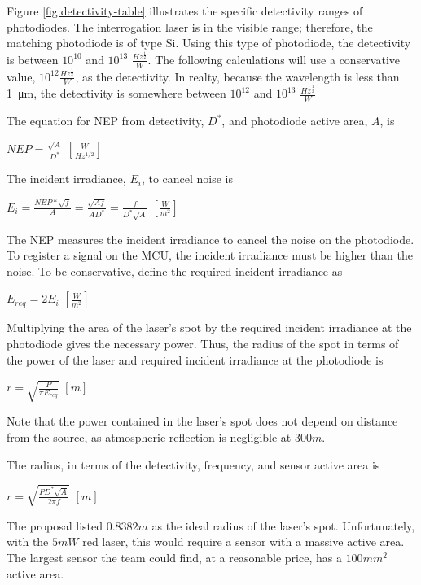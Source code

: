 \documentclass[letterpaper,10pt]{article}
\begin{document}
\begin{spacing}{1.15}
Figure \ref{fig:detectivity-table} illustrates the specific detectivity ranges of photodiodes. The interrogation laser is in the visible range; therefore, the matching photodiode is of type Si. Using this type of photodiode, the detectivity is between $10^{10}$ and $10^{13}$ $\frac{Hz^{\frac{1}{2}}}{W}$. The following calculations will use a conservative value, $10^{12} \frac{Hz^{\frac{1}{2}}}{W}$, as the detectivity. In realty, because the wavelength is less than \SI{1}{\micro\meter}, the detectivity is somewhere between $10^{12}$ and $10^{13}$ $\frac{Hz^{\frac{1}{2}}}{W}$

The equation for NEP from detectivity, $D^*$, and photodiode active area, $A$,  is 
\begin{center}
	{\large $NEP = \frac{\sqrt{A}}{D^*}$}  $[\frac{W}{Hz^{1/2}}]$
\end{center}

The incident irradiance, $E_i$, to cancel noise is
\begin{center}
	{\large $E_i = \frac{NEP * \sqrt{f}}{A} = \frac{\sqrt{Af}}{AD^*} = \frac{f}{D^*\sqrt{A}}$} $[\frac{W}{m^{2}}]$
\end{center}

The NEP measures the incident irradiance to cancel the noise on the photodiode. To register a signal on the MCU, the incident irradiance must be higher than the noise. To be conservative, define the required incident irradiance as 
\begin{center}
	{\large $E_{req} = 2E_i$} $[\frac{W}{m^{2}}]$
\end{center}

Multiplying the area of the laser's spot by the required incident irradiance at the photodiode gives the necessary power. Thus, the radius of the spot in terms of the power of the laser and required incident irradiance at the photodiode is 
\begin{center}
	{\large $r = \sqrt{\frac{P}{\pi E_{req}}}$} $[m]$
\end{center}

Note that the power contained in the laser's spot does not depend on distance from the source, as atmospheric reflection is negligible at $300 m$.

The radius, in terms of the detectivity, frequency, and sensor active area is
\begin{center}
	{\large $r = \sqrt{\frac{PD^*\sqrt{A}}{2 \pi f}}$} $[m]$
\end{center}

The proposal listed $0.8382 m$ as the ideal radius of the laser's spot. Unfortunately, with the $5mW$ red laser, this would require a sensor with a massive active area. The largest sensor the team could find, at a reasonable price, has a $100 mm^2$ active area. 


\end{spacing}
\end{document}
